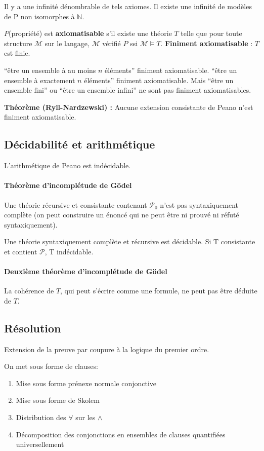 \documentclass[french]{article}
\begin{document}
Il y a une infinité dénombrable de tels axiomes. Il existe une infinité de modèles de P non isomorphes à $\mathbb{N}$.

$P$(propriété) est \textbf{axiomatisable} s'il existe une théorie $T$ telle que pour toute structure $\mathcal{M}$ sur le langage, $\mathcal{M}$ vérifié $P$ ssi $\mathcal{M}\models T$. \textbf{Finiment axiomatisable} : $T$ est finie.

``être un ensemble à au moins $n$ éléments'' finiment axiomatisable.
``être un ensemble à exactement $n$ éléments'' finiment axiomatisable.
Mais ``être un ensemble fini'' ou ``être un ensemble infini'' ne sont pas finiment axiomatisables.

\textbf{Théorème (Ryll-Nardzewski) :} Aucune extension consistante de Peano n'est finiment axiomatisable.

\subsection{Décidabilité et arithmétique}
L'arithmétique de Peano est indécidable.
\paragraph{Théorème d'incomplétude de Gödel} Une théorie récursive et consistante contenant $\mathcal{P}_0$ n'est pas syntaxiquement complète (on peut construire un énoncé qui ne peut être ni prouvé ni réfuté syntaxiquement).

Une théorie syntaxiquement complète et récursive est décidable. Si T consistante et contient $\mathcal{P}$, T indécidable.

\paragraph{Deuxième théorème d'incomplétude de Gödel}
La cohérence de $T$, qui peut s'écrire comme une formule, ne peut pas être déduite de $T$.

\subsection{Résolution}
Extension de la preuve par coupure à la logique du premier ordre.

On met sous forme de clauses:
\begin{enumerate}
\item Mise sous forme prénexe normale conjonctive
\item Mise sous forme de Skolem
\item Distribution des $\forall$ sur les $\wedge$
\item Décomposition des conjonctions en ensembles de clauses quantifiées universellement
\end{enumerate}
\end{document}
